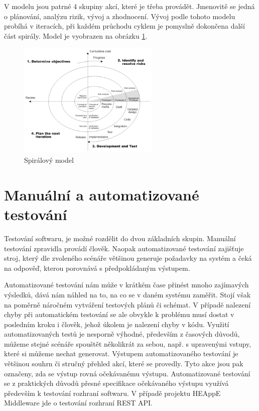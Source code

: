V modelu jsou patrné 4 skupiny akcí, které je třeba provádět. Jmenovitě se jedná o plánování, analýzu rizik, vývoj a zhodnocení. Vývoj podle tohoto modelu probíhá v iteracích, při každém průchodu cyklem je pomyslně dokončena další část spirály. Model je vyobrazen na obrázku \ref{fig:spiral-model}.



\begin{figure}
	\centering
	\includegraphics[width=0.6\textwidth]{Figures/Spiral_model_Boehm_1988.png}
	\caption{Spirálový model \cite{ee27bbyhk5LP1Ekm}}
	\label{fig:spiral-model}
\end{figure}

\section{Manuální a automatizované testování}
Testování softwaru, je možné rozdělit do dvou základních skupin. Manuální testování zpravidla provádí člověk. Naopak automatizované testování zajišťuje stroj, který dle zvoleného scénáře většinou generuje požadavky na systém a čeká na odpověď, kterou porovnává s předpokládaným výstupem.

Automatizované testování nám může v krátkém čase přinést mnoho zajímavých výsledků, dává nám náhled na to, na co se v daném systému zaměřit. Stojí však na poměrně náročném vytváření testových plánů či schémat. V případě nalezení chyby při automatickém testování se ale obvykle k problému musí dostat v posledním kroku i člověk, jehož úkolem je nalezení chyby v kódu. Využití automatizovaných testů je nesporně výhodné, především z časových důvodů, můžeme stejné scénáře spouštět několikrát za sebou, např. s upravenými vstupy, které si můžeme nechat generovat. Výstupem automatizovaného testování je většinou souhrn či stručný přehled akcí, které se provedly. Tyto akce jsou pak označeny, zda se výstup rovná očekávanému výstupu. Automatizované testování se z praktických důvodů přesné specifikace očekávaného výstupu využívá především k testování rozhraní softwaru. V případě projektu HEAppE Middleware jde o testování rozhraní REST API.

